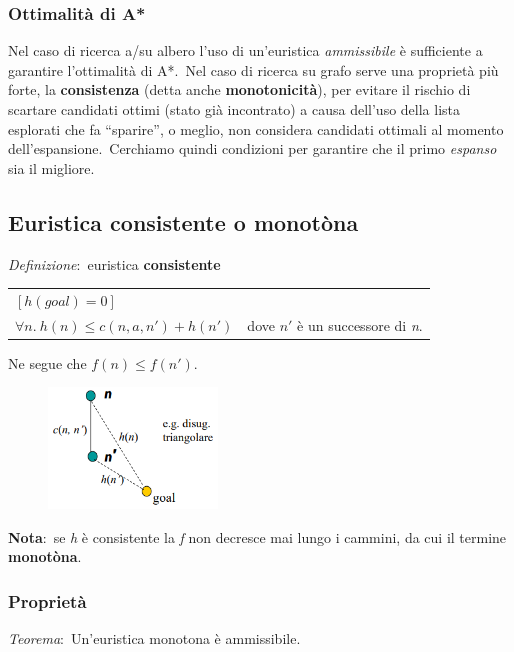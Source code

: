 \subsubsection{Ottimalità di A*}
Nel caso di ricerca a/su albero l'uso di un'euristica \textit{ammissibile} è sufficiente a garantire l'ottimalità di A*.\
Nel caso di ricerca su grafo serve una proprietà più forte, la \textbf{consistenza} (detta anche \textbf{monotonicità}), per evitare il rischio di scartare candidati ottimi (stato già incontrato) a causa dell'uso della lista esplorati che fa ``sparire'', o meglio, non considera candidati ottimali al momento dell'espansione.\
Cerchiamo quindi condizioni per garantire che il primo \textit{espanso} sia il migliore.

\subsection{Euristica consistente o monotòna}

\textit{Definizione}:\ euristica \textbf{consistente}
\begin{table}[H]
	\centering
	\begin{tabular}{l l}
		$[ h(goal) = 0 ]$                          &                                          \\
		$\forall n.\ h(n)\leq c(n, a, n') + h(n')$ & dove $n'$ è un successore di \textit{n}.
	\end{tabular}
\end{table}
\noindent Ne segue che $f(n) \leq f(n')$.\

\begin{figure}[H]
	\centering
	\includegraphics[width=0.4\textwidth]{immagini/eu_consistente.png}
\end{figure}

\noindent\textbf{Nota}:\ se \textit{h} è consistente la \textit{f} non decresce mai lungo i cammini, da cui il termine \textbf{monotòna}.

\subsubsection{Proprietà}
\textit{Teorema}:\ Un'euristica monotona è ammissibile.\

